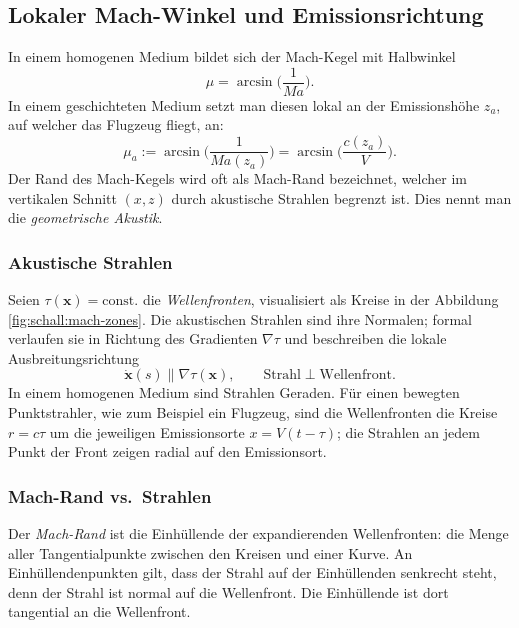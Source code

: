 \subsection{Lokaler Mach-Winkel und Emissionsrichtung}
\label{schall:lok-mach-emission}
In einem homogenen Medium bildet sich der Mach-Kegel mit Halbwinkel
\begin{equation*}
    \mu = \arcsin\biggl(\frac{1}{\textit{Ma}}\biggr).
\end{equation*}
In einem geschichteten Medium setzt man diesen lokal an der
Emissionshöhe $z_a$, auf welcher das Flugzeug fliegt, an:
\begin{equation}
    \mu_a := \arcsin\biggl(\frac{1}{\textit{Ma}(z_a)}\biggr)
    = \arcsin\biggl(\frac{c(z_a)}{V}\biggr) .
    \label{eq:local-mach-angle}
\end{equation}
Der Rand des Mach-Kegels wird oft als Mach-Rand bezeichnet, welcher im
vertikalen Schnitt $(x,z)$ durch akustische Strahlen begrenzt ist.
Dies nennt man die \emph{geometrische Akustik}.

\subsubsection{Akustische Strahlen}
Seien $\tau(\boldsymbol{x})=\mathrm{const.}$ die \emph{Wellenfronten}, visualisiert
als Kreise in der Abbildung \ref{fig:schall:mach-zones}.
Die akustischen Strahlen sind ihre Normalen; formal verlaufen sie
in Richtung des Gradienten $\nabla\tau$ und beschreiben die lokale
Ausbreitungsrichtung
\[
    \dot{\boldsymbol{x}}(s) \parallel \nabla\tau(\boldsymbol{x}),\qquad
    \text{Strahl} \perp \text{Wellenfront}.
\]
In einem homogenen Medium sind Strahlen Geraden.
Für einen bewegten Punktstrahler, wie zum Beispiel ein Flugzeug,
sind die Wellenfronten die Kreise $r=c\tau$ um die jeweiligen Emissionsorte
$x=V(t-\tau)$; die Strahlen an jedem Punkt der Front zeigen radial auf den Emissionsort.

\subsubsection{Mach-Rand vs.~Strahlen}
Der \emph{Mach-Rand} ist die Einhüllende der expandierenden Wellenfronten:
%
die Menge aller Tangentialpunkte zwischen den Kreisen und einer Kurve.
An Einhüllendenpunkten gilt, dass der Strahl auf der Einhüllenden senkrecht
steht,
denn der Strahl ist normal auf die Wellenfront.
Die Einhüllende ist dort tangential an die Wellenfront.

